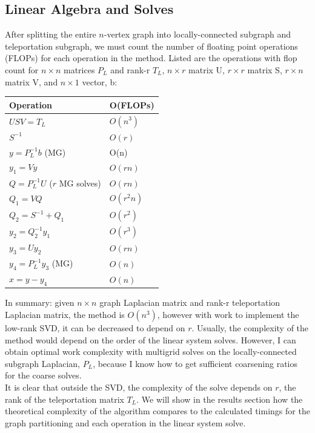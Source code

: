 \documentclass{article}
\begin{document}
\subsection{Linear Algebra and Solves}
After splitting the entire $n$-vertex graph into locally-connected subgraph and teleportation subgraph, we must count the number of floating point operations (FLOPs) for each operation in the method. Listed are the operations with flop count for $n\times n$ matrices $P_L$ and rank-r $T_L$, $n\times r$ matrix U, $r\times r$ matrix S, $r\times n$ matrix V, and $n\times 1$ vector, b:\\
\begin{spacing}{1}
\begin{center}
\renewcommand{\arraystretch}{1.5}
    \begin{tabular}{ | l | l |}
    \hline
    \textbf{Operation} & \textbf{O(FLOPs)} \\ \hline
    $USV = T_L$ & $O(n^3)$ \\ \hline
    $S^{-1}$ & $O(r)$ \\ \hline
    $y = P_L^{-1}b$ (MG) & O(n)  \\  \hline
    $y_1 = Vy$ & $O(rn)$ \\ \hline
    $Q = P_L^{-1}U$ ($r$ MG solves) & $O(rn)$ \\ \hline
    $Q_1 = VQ$ & $O(r^2 n)$ \\ \hline
    $Q_2 = S^{-1} + Q_1$ & $O(r^2)$ \\ \hline
    $y_2 = Q_2^{-1}y_1$ & $O(r^3)$ \\ \hline
    $y_3 = Uy_2$ & $O(rn)$ \\ \hline
    $y_4 = P_L^{-1}y_3$ (MG) & $O(n)$ \\ \hline
    $x = y - y_4$ & $O(n)$ \\
    \hline
    \end{tabular}
\end{center}
\end{spacing}
\vspace{.2in}
In summary: given $n\times n$ graph Laplacian matrix and rank-r teleportation Laplacian matrix, the method is $O(n^3)$, however with work to implement the low-rank SVD, it can be decreased to depend on $r$. Usually, the complexity of the method would depend on the order of the linear system solves. However, I can obtain optimal work complexity with multigrid solves on the locally-connected subgraph Laplacian, $P_L$, because I know how to get sufficient coarsening ratios for the coarse solves.\\
It is clear that outside the SVD, the complexity of the solve depends on $r$, the rank of the teleportation matrix $T_L$. We will show in the results section how the theoretical complexity of the algorithm compares to the calculated timings for the graph partitioning and each operation in the linear system solve.





%
%
\end{document}
